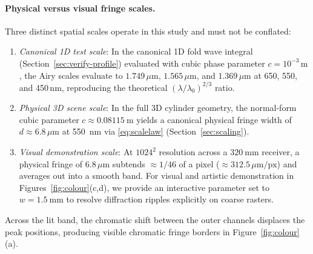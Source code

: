 \paragraph{Physical versus visual fringe scales.}
Three distinct spatial scales operate in this study and must not be conflated:
\begin{enumerate}
\item \emph{Canonical 1D test scale}: In the canonical 1D fold wave integral
      (Section~\ref{sec:verify-profile}) evaluated with cubic phase parameter
      $c = 10^{-3}\,\si{\meter}$, the Airy scales evaluate to
      $1.749\,\mu\text{m}$, $1.565\,\mu\text{m}$, and $1.369\,\mu\text{m}$
      at 650, 550, and 450\,nm, reproducing the theoretical $(\lambda/\lambda_0)^{2/3}$
      ratio.
\item \emph{Physical 3D scene scale}: In the full 3D cylinder geometry,
      the normal-form cubic parameter $c \approx \SI{0.08115}{\meter}$ yields a canonical physical fringe width of
      $d \approx 6.8\,\mu\text{m}$ at \SI{550}{\nano\meter} via \eqref{eq:scalelaw}
      (Section~\ref{sec:scaling}).
\item \emph{Visual demonstration scale}: At $1024^2$ resolution across a
      $\SI{320}{\milli\meter}$ receiver, a physical fringe of $6.8\,\mu\text{m}$
      subtends $\approx 1/46$ of a pixel ($\approx 312.5\,\mu\text{m}/\text{px}$) and
      averages out into a smooth band. For visual and artistic demonstration in
      Figures~\ref{fig:colour}(c,d), we provide an interactive parameter set to
      $w = \SI{1.5}{\milli\meter}$ to resolve
      diffraction ripples explicitly on coarse rasters.
\end{enumerate}
Across the lit band, the chromatic shift between the outer channels displaces the
peak positions, producing visible chromatic fringe borders in Figure~\ref{fig:colour}(a).

